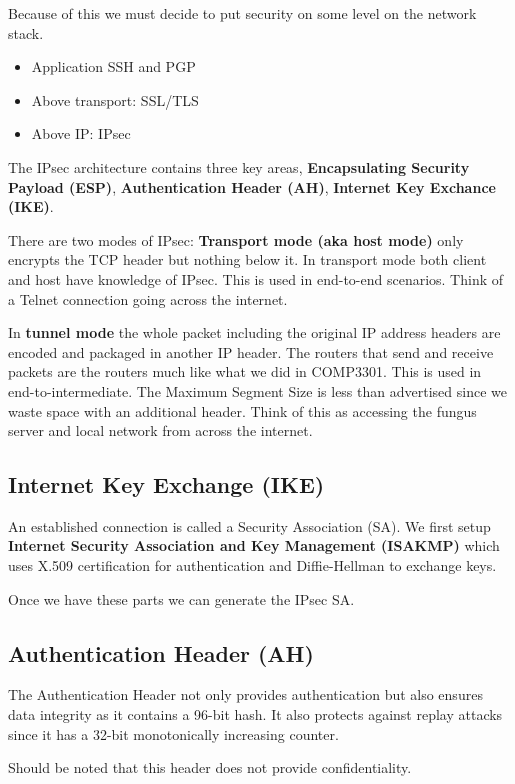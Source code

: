 \documentclass{report}
\begin{document}
Because of this we must decide to put security on some level on the network
stack.
\begin{itemize}
    \item Application SSH and PGP
    \item Above transport: SSL/TLS
    \item Above IP: IPsec
\end{itemize}

The IPsec architecture contains three key areas,
\textbf{Encapsulating Security Payload (ESP)},
\textbf{Authentication Header (AH)},
\textbf{Internet Key Exchance (IKE)}.

There are two modes of IPsec:
\textbf{Transport mode (aka host mode)} only encrypts the TCP header but
nothing below it. In transport mode both client and host have knowledge of
IPsec. This is used in end-to-end scenarios. Think of a Telnet connection
going across the internet.

In \textbf{tunnel mode} the whole packet including the original IP address
headers are encoded and packaged in another IP header. The routers
that send and receive packets are the routers much like what we did in COMP3301.
This is used in end-to-intermediate. The Maximum Segment Size is less than
advertised since we waste space with an additional header. Think of this as
accessing the fungus server and local network from across the internet.

\subsection{Internet Key Exchange (IKE)}
An established connection is called a Security Association (SA).
We first setup \textbf{Internet Security Association and Key Management (ISAKMP)}
which uses X.509 certification for authentication and Diffie-Hellman to exchange
keys.

Once we have these parts we can generate the IPsec SA.

\subsection{Authentication Header (AH)}
The Authentication Header not only provides authentication but also ensures data
integrity as it contains a 96-bit hash. It also protects against replay attacks
since it has a 32-bit monotonically increasing counter.

Should be noted that this header does not provide confidentiality.
\end{document}
